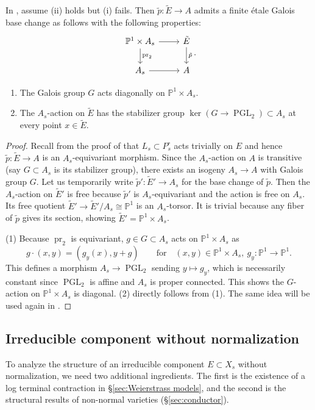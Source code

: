 \documentclass[reqno, letterpaper]{amsart}
\numberwithin{equation}{subsection}
\let\to\longrightarrow
\let\mapsto\longmapsto
\newcommand{\PP}{\mathbb{P}}
\DeclareMathOperator{\PGL}{PGL}
\DeclareMathOperator{\pr}{pr}
\begin{document}
		\begin{lemma} \label{lem:E normalization structure-unstable}
			In , assume (ii) holds but (i) fails. Then $\tilde p : \tilde E \to A$ admits a finite \'etale Galois base change as follows with the following properties:
			\[\begin{tikzcd}
				\PP^1 \times A_s \arrow[r] \arrow[d, "\pr_2"] & \tilde E \arrow[d, "\tilde p"] \\
				A_s \arrow[r] & A
			\end{tikzcd}.\]
			\begin{enumerate}
				\item The Galois group $G$ acts diagonally on $\PP^1 \times A_s$.
				\item The $A_s$-action on $\tilde E$ has the stabilizer group $\ker (G \to \PGL_2) \subset A_s$ at every point $x \in \tilde E$.
			\end{enumerate}
		\end{lemma}
		\begin{proof}
			Recall from the proof of  that $L_s \subset P^\circ_s$ acts trivially on $E$ and hence $\tilde p : \tilde E \to A$ is an $A_s$-equivariant morphism. Since the $A_s$-action on $A$ is transitive (say $G \subset A_s$ is its stabilizer group), there exists an isogeny $A_s \to A$ with Galois group $G$. Let us temporarily write $\tilde p' : \tilde E' \to A_s$ for the base change of $\tilde p$. Then the $A_s$-action on $\tilde E'$ is free because $\tilde p'$ is $A_s$-equivariant and the action is free on $A_s$. Its free quotient $\tilde E' \to \tilde E' / A_s \cong \PP^1$ is an $A_s$-torsor. It is trivial because any fiber of $\tilde p$ gives its section, showing $\tilde E' = \PP^1 \times A_s$.
			
			\medskip
			
			(1) Because $\pr_2$ is equivariant, $g \in G \subset A_s$ acts on $\PP^1 \times A_s$ as
			\[ g \cdot (x, y) = (g_y(x), y + g) \qquad\mbox{for}\quad (x,y) \in \PP^1 \times A_s , \ g_y : \PP^1 \to \PP^1 .\]
			This defines a morphism $A_s \to \PGL_2$ sending $y \mapsto g_y$, which is necessarily constant since $\PGL_2$ is affine and $A_s$ is proper connected. This shows the $G$-action on $\PP^1 \times A_s$ is diagonal. (2) directly follows from (1). The same idea will be used again in .
		\end{proof}
		
		
		
	\subsection{Irreducible component without normalization}
		To analyze the structure of an irreducible component $E \subset X_s$ without normalization, we need two additional ingredients. The first is the existence of a log terminal contraction in \S \ref{sec:Weierstrass models}, and the second is the structural results of non-normal varieties (\S \ref{sec:conductor}).
		
\end{document}

